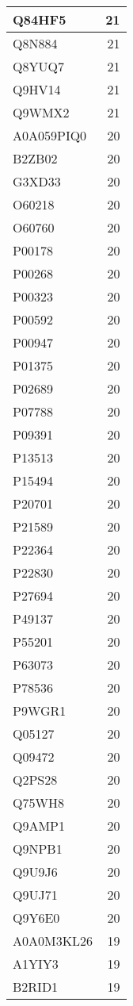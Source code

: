 \documentclass[
]{book}
\theoremstyle{definition}
\theoremstyle{definition}
\theoremstyle{definition}
\theoremstyle{definition}
\theoremstyle{remark}
\begin{document}
\begin{table}
\begin{tabular}{l|r}
\hline
Q84HF5 & 21\\
\hline
Q8N884 & 21\\
\hline
Q8YUQ7 & 21\\
\hline
Q9HV14 & 21\\
\hline
Q9WMX2 & 21\\
\hline
A0A059PIQ0 & 20\\
\hline
B2ZB02 & 20\\
\hline
G3XD33 & 20\\
\hline
O60218 & 20\\
\hline
O60760 & 20\\
\hline
P00178 & 20\\
\hline
P00268 & 20\\
\hline
P00323 & 20\\
\hline
P00592 & 20\\
\hline
P00947 & 20\\
\hline
P01375 & 20\\
\hline
P02689 & 20\\
\hline
P07788 & 20\\
\hline
P09391 & 20\\
\hline
P13513 & 20\\
\hline
P15494 & 20\\
\hline
P20701 & 20\\
\hline
P21589 & 20\\
\hline
P22364 & 20\\
\hline
P22830 & 20\\
\hline
P27694 & 20\\
\hline
P49137 & 20\\
\hline
P55201 & 20\\
\hline
P63073 & 20\\
\hline
P78536 & 20\\
\hline
P9WGR1 & 20\\
\hline
Q05127 & 20\\
\hline
Q09472 & 20\\
\hline
Q2PS28 & 20\\
\hline
Q75WH8 & 20\\
\hline
Q9AMP1 & 20\\
\hline
Q9NPB1 & 20\\
\hline
Q9U9J6 & 20\\
\hline
Q9UJ71 & 20\\
\hline
Q9Y6E0 & 20\\
\hline
A0A0M3KL26 & 19\\
\hline
A1YIY3 & 19\\
\hline
B2RID1 & 19\\

\end{tabular}
\end{table}
\end{document}
